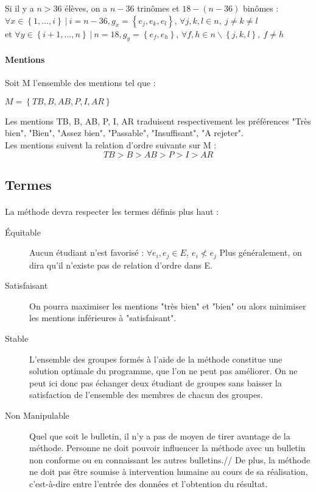 \documentclass[10pt,a4paper]{scrartcl}
\begin{document}
Si il y a $n > 36$ élèves, on a $n-36$ trinômes et $18-(n-36)$ binômes : \\
$\forall x \in \left\{ 1, ..., i \right\} \ | \ i=n-36, g_{x} = \left\{ e_{j}, e_{k}, e_{l} \right\}$, $\forall j, k, l \in n,\ j \neq k \neq l$ \\
et $\forall y \in \left\{ i+1, ..., n \right\} \ | \ n=18, g_{y} = \left\{ e_{f}, e_{h} \right\}$, $\forall f, h \in n\backslash\left\{ j, k, l \right\},\ f \neq h$

\paragraph{Mentions} Soit M l'ensemble des mentions tel que :
\begin{center}
	$M=\left\{ TB, B, AB, P, I, AR \right\}$
\end{center}
Les mentions TB, B, AB, P, I, AR traduisent respectivement les préférences "Très bien", "Bien", "Assez bien", "Passable", "Insuffisant", "A rejeter". \\
Les mentions suivent la relation d'ordre suivante sur M : \\
$$ TB>B>AB>P>I>AR$$
\subsection{Termes}
\paragraph{}
La méthode devra respecter les termes définis plus haut :
\begin{description}
\item[Équitable]
Aucun étudiant n'est favorisé : 
$\forall e_{i},e_{j} \in E,\ e_{i} \nless e_{j}$
Plus généralement, on dira qu'il n'existe pas de relation d'ordre dans E.
\item[Satisfaisant]
On pourra maximiser les mentions "très bien" et "bien" ou alors minimiser les mentions inférieures à "satisfaisant".
\item[Stable]
L'ensemble des groupes formés à l'aide de la méthode constitue une solution optimale du programme, que l'on ne peut pas améliorer. On ne peut ici donc pas échanger deux étudiant de groupes sans baisser la satisfaction de l'ensemble des membres de chacun des groupes.
\item[Non Manipulable]
Quel que soit le bulletin, il n'y a pas de moyen de tirer avantage de la méthode. Personne ne doit pouvoir influencer la méthode avec un bulletin non conforme ou en connaissant les autres bulletins.//
De plus, la méthode ne doit pas être soumise à intervention humaine au cours de sa réalisation, c'est-à-dire entre l'entrée des données et l'obtention du résultat.
\end{description}
\end{document}
